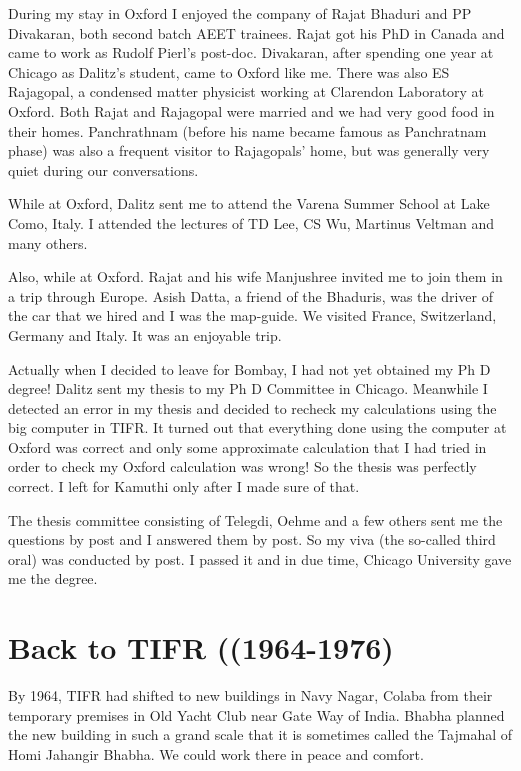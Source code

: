 During my stay in Oxford I enjoyed the company of Rajat Bhaduri and PP 
Divakaran, both second batch AEET trainees. Rajat got his PhD in Canada 
and came to work as Rudolf Pierl's post-doc. Divakaran, after spending 
one year at Chicago as Dalitz's student, came to Oxford like me. There 
was also ES Rajagopal, a condensed matter physicist working at Clarendon 
Laboratory at Oxford. Both Rajat and Rajagopal were married and we had 
very good food in their homes. Panchrathnam (before his name became 
famous as Panchratnam phase) was also a frequent visitor to Rajagopals' 
home, but was generally very quiet during our conversations.

While at Oxford, Dalitz sent me to attend the Varena Summer School at 
Lake Como, Italy. I attended the lectures of TD Lee, CS Wu, Martinus 
Veltman and many others.

Also, while at Oxford. Rajat and his wife Manjushree invited me to join 
them in a trip through Europe. Asish Datta, a friend of the Bhaduris, 
was the driver of the car that we hired and I was the map-guide. We 
visited France, Switzerland, Germany and Italy. It was an enjoyable 
trip.
 
Actually when I decided to leave for Bombay, I had not yet obtained my 
Ph D degree! Dalitz sent my thesis to my Ph D Committee in Chicago. 
Meanwhile I detected an error in my thesis and decided to recheck my 
calculations using the big computer in TIFR. It turned out that 
everything done using the computer at Oxford was correct and only some 
approximate calculation that I had tried in order to check my Oxford 
calculation was wrong! So the thesis was perfectly correct. I left for 
Kamuthi only after I made sure of that.

The thesis committee consisting of Telegdi, Oehme and a few others sent 
me the questions by post and I answered them by post. So my viva (the 
so-called third oral) was conducted by post. I passed it and in due 
time, Chicago University gave me the degree.

\section*{Back to TIFR ((1964-1976)}

By 1964, TIFR had shifted to new buildings in Navy Nagar, Colaba from 
their temporary premises in Old Yacht Club near Gate Way of India. 
Bhabha planned the new building in such a grand scale that it is 
sometimes called the Tajmahal of Homi Jahangir Bhabha. We could work 
there in peace and comfort.

